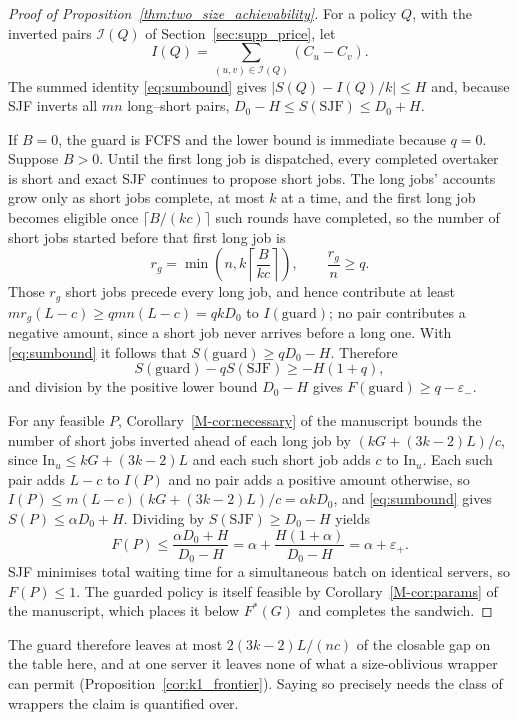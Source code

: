 \documentclass[mathematics,supfile,submit,moreauthors]{Definitions/mdpi}
\begin{document}
\begin{proof}[Proof of Proposition~\ref{thm:two_size_achievability}]
For a policy $Q$, with the inverted pairs $\mathcal I(Q)$ of Section~\ref{sec:supp_price}, let
\[
 I(Q)=\sum_{(u,v)\in\mathcal I(Q)}(C_u-C_v).
\]
The summed identity \eqref{eq:sumbound} gives
$|S(Q)-I(Q)/k|\leq H$ and, because SJF inverts all $mn$ long--short
pairs, $D_0-H\leq S(\mathrm{SJF})\leq D_0+H$.

If $B=0$, the guard is FCFS and the lower bound is immediate because $q=0$.
Suppose $B>0$. Until the first long job is dispatched, every completed
overtaker is short and exact SJF continues to propose short jobs. The long jobs'
accounts grow only as short jobs complete, at most $k$ at a time, and the first long job
becomes eligible once $\lceil B/(kc)\rceil$ such rounds have completed, so the number of
short jobs started before that first long job is
\[
 r_g=\min\!\left(n,k\left\lceil\frac{B}{kc}\right\rceil\right),
 \qquad \frac{r_g}{n}\geq q.
\]
Those $r_g$ short jobs precede every long job, and hence contribute at least
$m r_g(L-c)\geq qmn(L-c)=qkD_0$ to $I(\mathrm{guard})$; no pair contributes a negative
amount, since a short job never arrives before a long one. With
\eqref{eq:sumbound} it follows that $S(\mathrm{guard})\geq qD_0-H$. Therefore
\[
 S(\mathrm{guard})-qS(\mathrm{SJF})\geq-H(1+q),
\]
and division by the positive lower bound $D_0-H$ gives
$F(\mathrm{guard})\geq q-\varepsilon_-$.

For any feasible $P$, Corollary~\ref*{M-cor:necessary} of the manuscript bounds the number of short
jobs inverted ahead of each long job by
$(kG+(3k-2)L)/c$, since $\mathrm{In}_u\leq kG+(3k-2)L$ and each such short job adds $c$
to $\mathrm{In}_u$. Each such pair adds $L-c$ to $I(P)$ and no pair adds a positive amount
otherwise, so $I(P)\leq m(L-c)(kG+(3k-2)L)/c=\alpha kD_0$, and \eqref{eq:sumbound} gives
$S(P)\leq \alpha D_0+H$. Dividing by
$S(\mathrm{SJF})\geq D_0-H$ yields
\[
 F(P)\leq\frac{\alpha D_0+H}{D_0-H}
      =\alpha+\frac{H(1+\alpha)}{D_0-H}=\alpha+\varepsilon_+.
\]
SJF minimises total waiting time for a simultaneous batch on identical servers,
so $F(P)\leq1$. The guarded policy is itself feasible by
Corollary~\ref*{M-cor:params} of the manuscript, which places it below $F^*(G)$ and completes the
sandwich.
\end{proof}

The guard therefore leaves at most $2(3k-2)L/(nc)$ of the closable gap on the
table here, and at one server it leaves none of what a size-oblivious wrapper can permit
(Proposition~\ref{cor:k1_frontier}). Saying so precisely needs the
class of wrappers the claim is quantified over.
\end{document}
